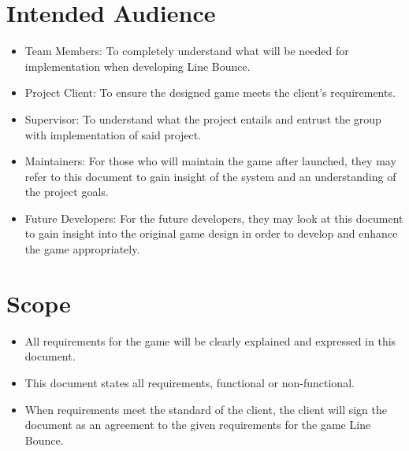 \section{Intended Audience }
\begin{itemize}
\item Team Members: To completely understand what will be needed for implementation
when developing Line Bounce. 
\item Project Client: To ensure the designed game meets the client\textquoteright{}s
requirements. 
\item Supervisor: To understand what the project entails and entrust the
group with implementation of said project. 
\item Maintainers: For those who will maintain the game after launched,
they may refer to this document to gain insight of the system and
an understanding of the project goals. 
\item Future Developers: For the future developers, they may look at this
document to gain insight into the original game design in order to
develop and enhance the game appropriately.
\end{itemize}

\section{Scope }
\begin{itemize}
\item All requirements for the game will be clearly explained and expressed
in this document. 
\item This document states all requirements, functional or non-functional. 
\item When requirements meet the standard of the client, the client will
sign the document as an agreement to the given requirements for the
game Line Bounce.\end{itemize}
